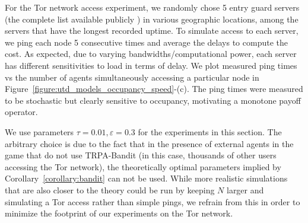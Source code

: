 For the Tor network access experiment, we randomly chose 5 entry guard servers (the complete list available publicly \cite{torentryguards}) in various geographic locations, among the servers that have the longest recorded uptime.
To simulate access to each server, we ping each node 5 consecutive times and average the delays to compute the cost.
As expected, due to varying bandwidths/computational power, each server has different sensitivities to load in terms of delay.
We plot measured ping times vs the number of agents simultaneously accessing a particular node in Figure~\ref{figure:utd_models_occupancy_speed}-(c).
The ping times were measured to be stochastic but clearly sensitive to occupancy, motivating a monotone payoff operator.

We use parameters $\tau = 0.01, \varepsilon = 0.3$ for the experiments in this section.
The arbitrary choice is due to the fact that in the presence of external agents in the game that do not use TRPA-Bandit (in this case, thousands of other users accessing the Tor network), the theoretically optimal parameters implied by Corollary~\ref{corollary:bandit} can not be used.
While more realistic simulations that are also closer to the theory could be run by keeping $N$ larger and simulating a Tor access rather than simple pings, we refrain from this in order to minimize the footprint of our experiments on the Tor network.



